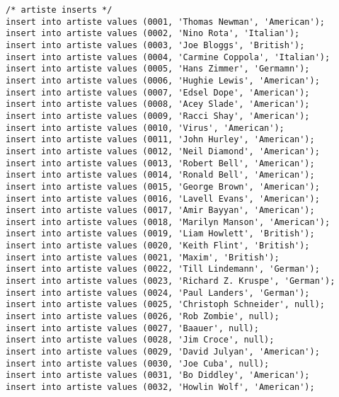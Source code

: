 \documentclass[12pt]{article}
\begin{document}
\begin{lstlisting}
/* artiste inserts */
insert into artiste values (0001, 'Thomas Newman', 'American');
insert into artiste values (0002, 'Nino Rota', 'Italian');
insert into artiste values (0003, 'Joe Bloggs', 'British');
insert into artiste values (0004, 'Carmine Coppola', 'Italian');
insert into artiste values (0005, 'Hans Zimmer', 'Germamn');
insert into artiste values (0006, 'Hughie Lewis', 'American');
insert into artiste values (0007, 'Edsel Dope', 'American');
insert into artiste values (0008, 'Acey Slade', 'American');
insert into artiste values (0009, 'Racci Shay', 'American');
insert into artiste values (0010, 'Virus', 'American');
insert into artiste values (0011, 'John Hurley', 'American');
insert into artiste values (0012, 'Neil Diamond', 'American');
insert into artiste values (0013, 'Robert Bell', 'American');
insert into artiste values (0014, 'Ronald Bell', 'American');
insert into artiste values (0015, 'George Brown', 'American');
insert into artiste values (0016, 'Lavell Evans', 'American');
insert into artiste values (0017, 'Amir Bayyan', 'American');
insert into artiste values (0018, 'Marilyn Manson', 'American');
insert into artiste values (0019, 'Liam Howlett', 'British');
insert into artiste values (0020, 'Keith Flint', 'British');
insert into artiste values (0021, 'Maxim', 'British');
insert into artiste values (0022, 'Till Lindemann', 'German');
insert into artiste values (0023, 'Richard Z. Kruspe', 'German');
insert into artiste values (0024, 'Paul Landers', 'German');
insert into artiste values (0025, 'Christoph Schneider', null);
insert into artiste values (0026, 'Rob Zombie', null);
insert into artiste values (0027, 'Baauer', null);
insert into artiste values (0028, 'Jim Croce', null);
insert into artiste values (0029, 'David Julyan', 'American');
insert into artiste values (0030, 'Joe Cuba', null);
insert into artiste values (0031, 'Bo Diddley', 'American');
insert into artiste values (0032, 'Howlin Wolf', 'American');


\end{lstlisting}
\end{document}

